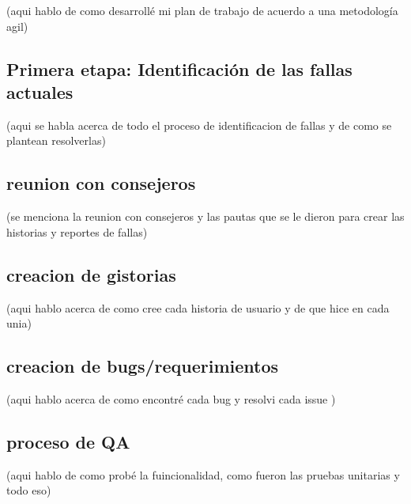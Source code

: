 (aqui hablo de como desarrollé mi plan de trabajo de acuerdo a una metodología agil)

\subsection{Primera etapa: Identificación de las fallas actuales}
(aqui se habla acerca de todo el proceso de identificacion de fallas y de como se plantean resolverlas)

\subsection{reunion con consejeros}
(se menciona la reunion con consejeros y las pautas que se le dieron para crear las historias y reportes de fallas)

\subsection{creacion de gistorias}
(aqui hablo acerca de como cree cada historia de usuario y de que hice en cada unia)

\subsection{creacion de bugs/requerimientos}
(aqui hablo acerca de como encontré cada bug y resolvi cada issue )

\subsection{proceso de QA}
(aqui hablo de como probé la fuincionalidad, como fueron las pruebas unitarias y todo eso)

